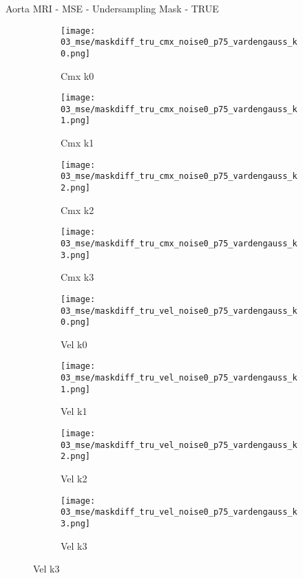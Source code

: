 \documentclass{beamer}
\begin{document}
\begin{frame}{Aorta MRI - MSE - Undersampling Mask - TRUE}{}
\begin{figure}
\begin{subfigure}{0.24\textwidth}
\texttt{[image: 03\_mse/maskdiff\_tru\_cmx\_noise0\_p75\_vardengauss\_k0.png]}
\vspace{-20pt}
\caption*{\tiny Cmx k0}
\end{subfigure}
\begin{subfigure}{0.24\textwidth}
\texttt{[image: 03\_mse/maskdiff\_tru\_cmx\_noise0\_p75\_vardengauss\_k1.png]}
\vspace{-20pt}
\caption*{\tiny Cmx k1}
\end{subfigure}
\begin{subfigure}{0.24\textwidth}
\texttt{[image: 03\_mse/maskdiff\_tru\_cmx\_noise0\_p75\_vardengauss\_k2.png]}
\vspace{-20pt}
\caption*{\tiny Cmx k2}
\end{subfigure}
\begin{subfigure}{0.24\textwidth}
\texttt{[image: 03\_mse/maskdiff\_tru\_cmx\_noise0\_p75\_vardengauss\_k3.png]}
\vspace{-20pt}
\caption*{\tiny Cmx k3}
\end{subfigure}

\begin{subfigure}{0.24\textwidth}
\texttt{[image: 03\_mse/maskdiff\_tru\_vel\_noise0\_p75\_vardengauss\_k0.png]}
\vspace{-20pt}
\caption*{\tiny Vel k0}
\end{subfigure}
\begin{subfigure}{0.24\textwidth}
\texttt{[image: 03\_mse/maskdiff\_tru\_vel\_noise0\_p75\_vardengauss\_k1.png]}
\vspace{-20pt}
\caption*{\tiny Vel k1}
\end{subfigure}
\begin{subfigure}{0.24\textwidth}
\texttt{[image: 03\_mse/maskdiff\_tru\_vel\_noise0\_p75\_vardengauss\_k2.png]}
\vspace{-20pt}
\caption*{\tiny Vel k2}
\end{subfigure}
\begin{subfigure}{0.24\textwidth}
\texttt{[image: 03\_mse/maskdiff\_tru\_vel\_noise0\_p75\_vardengauss\_k3.png]}
\vspace{-20pt}
\caption*{\tiny Vel k3}
\end{subfigure}
\end{figure}
\end{frame}
\end{document}
